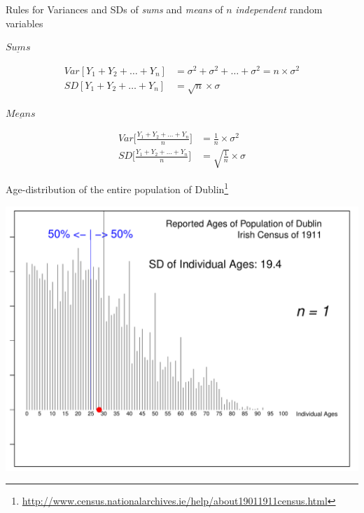 \documentclass[10pt,handout]{beamer}\usepackage[]{graphicx}\usepackage[]{color}
\makeatletter
\def\maxwidth{ %
  \ifdim\Gin@nat@width>\linewidth
    \linewidth
  \else
    \Gin@nat@width
  \fi
}
\newenvironment{knitrout}{}{} %
\makeatother
\begin{document}
\begin{frame}{Rules for Variances and SDs of \emph{sums} and \emph{means} of \(n\) \emph{independent} random variables}

$\underline{Sums}$


\begin{align*}
Var[ Y_1 + Y_2 + \dots + Y_n] &= \sigma^2 + \sigma^2 + \dots + \sigma^2 = n \times \sigma^2 \\
SD[ Y_1 + Y_2 + \dots + Y_n]  &= \sqrt{n} \times \sigma
\end{align*}


\pause


$\underline{Means}$
	

\begin{align*}
	Var\bigg[\frac{Y_1 + Y_2 + \dots + Y_n}{n}\bigg] &=  \frac{1}{n} \times \sigma^2 \\
	SD\bigg[\frac{Y_1 + Y_2 + \dots + Y_n}{n}\bigg] &=  \sqrt{\frac{1}{n}} \times \sigma
\end{align*}


\end{frame}



\begin{frame}[fragile]{Age-distribution of the entire population of Dublin\footnote{\tiny{\url{http://www.census.nationalarchives.ie/help/about19011911census.html}}}}
\begin{knitrout}\tiny
{}\color{fgcolor}

{\centering \includegraphics[width=\maxwidth]{figure/unnamed-chunk-1-1} 

}



\end{knitrout}

\end{frame}
\end{document}
